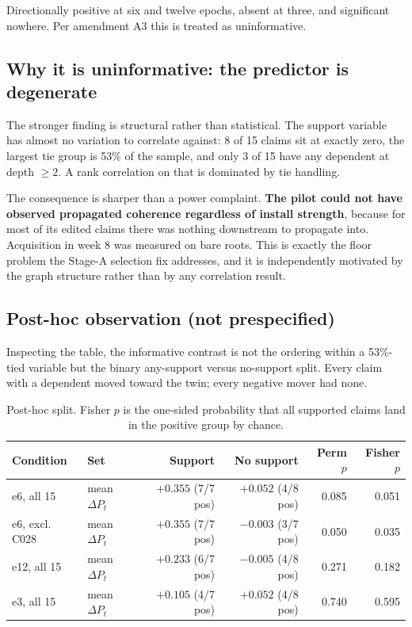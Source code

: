 \documentclass[11pt]{article}
\begin{document}
Directionally positive at six and twelve epochs, absent at three, and
significant nowhere. Per amendment A3 this is treated as uninformative.

\subsection{Why it is uninformative: the predictor is degenerate}

The stronger finding is structural rather than statistical. The support variable
has almost no variation to correlate against: 8 of 15 claims sit at exactly zero,
the largest tie group is 53\% of the sample, and only 3 of 15 have any dependent
at depth $\geq 2$. A rank correlation on that is dominated by tie handling.

The consequence is sharper than a power complaint. \textbf{The pilot could not
have observed propagated coherence regardless of install strength}, because for
most of its edited claims there was nothing downstream to propagate into.
Acquisition in week 8 was measured on bare roots. This is exactly the floor
problem the Stage-A selection fix addresses, and it is independently motivated by
the graph structure rather than by any correlation result.

\subsection{Post-hoc observation (not prespecified)}

Inspecting the table, the informative contrast is not the ordering within a
53\%-tied variable but the binary any-support versus no-support split. Every
claim with a dependent moved toward the twin; every negative mover had none.

\begin{table}[h]
\centering
\begin{tabular}{llrrrr}
\toprule
Condition & Set & Support & No support & Perm $p$ & Fisher $p$ \\
\midrule
e6, all 15      & mean $\Delta P_t$ & $+0.355$ (7/7 pos) & $+0.052$ (4/8 pos) & 0.085 & 0.051 \\
e6, excl. C028  & mean $\Delta P_t$ & $+0.355$ (7/7 pos) & $-0.003$ (3/7 pos) & 0.050 & 0.035 \\
e12, all 15     & mean $\Delta P_t$ & $+0.233$ (6/7 pos) & $-0.005$ (4/8 pos) & 0.271 & 0.182 \\
e3, all 15      & mean $\Delta P_t$ & $+0.105$ (4/7 pos) & $+0.052$ (4/8 pos) & 0.740 & 0.595 \\
\bottomrule
\end{tabular}
\caption{Post-hoc split. Fisher $p$ is the one-sided probability that all
supported claims land in the positive group by chance.}
\end{table}
\end{document}
